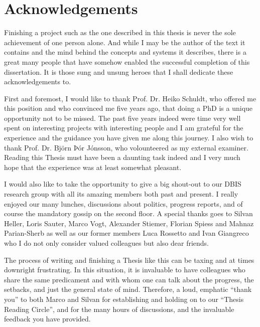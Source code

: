 
\chapter{Acknowledgements}

Finishing a project such as the one described in this thesis is never the sole achievement of one person alone. And while I may be the author of the text it contains and the mind behind the concepts and systems it describes, there is a great many people that have somehow enabled the successful completion of this dissertation. It is those sung and unsung heroes that I shall dedicate these acknowledgements to.

First and foremost, I would like to thank Prof. Dr. Heiko Schuldt, who offered me this position and who convinced me five years ago, that doing a PhD is a unique opportunity not to be missed. The past five years indeed were time very well spent on interesting projects with interesting people and I am grateful for the experience and the guidance you have given me along this journey. I also wish to thank Prof. Dr. Björn Þór Jónsson, who volounteered as my external examiner. Reading this Thesis must have been a daunting task indeed and I very much hope that the experience was at least somewhat pleasant.

I would also like to take the opportunity to give a big shout-out to our DBIS research group with all its amazing members both past and present. I really enjoyed our many lunches, discussions about politics, progress reports, and of course the mandatory gossip on the second floor. A special thanks goes to Silvan Heller, Loris Sauter, Marco Vogt, Alexander Stiemer, Florian Spiess and Mahnaz Parian-Sherb as well as our former members Luca Rossetto and Ivan Giangreco who I do not only consider valued colleagues but also dear friends.  

The process of writing and finishing a Thesis like this can be taxing and at times downright frustrating. In this situation, it is invaluable to have colleagues who share the same predicament and with whom one can talk about the progress, the setbacks, and just the general state of mind. Therefore, a loud, emphatic ``thank you'' to both Marco and Silvan for establishing and holding on to our ``Thesis Reading Circle'', and for the many hours of discussions, and the invaluable feedback you have provided.

